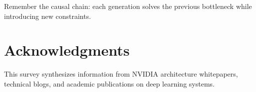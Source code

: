 \documentclass{article}
\begin{document}
Remember the causal chain: each generation solves the previous bottleneck while introducing new constraints.

\section*{Acknowledgments}

This survey synthesizes information from NVIDIA architecture whitepapers, technical blogs, and academic publications on deep learning systems.



\end{document}
